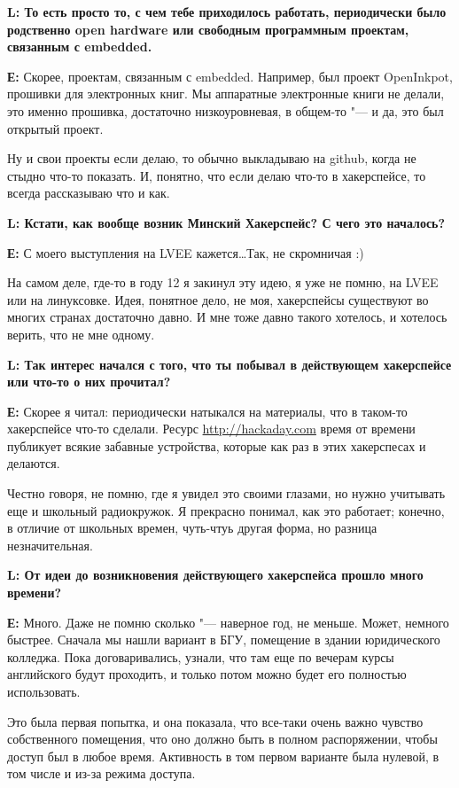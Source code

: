 \documentclass[10pt, a5paper]{article}
\begin{document}
{\noindent \bf L: То есть просто то, с чем тебе приходилось работать, периодически  было родственно open hardware или свободным программным проектам, связанным с embedded.}

{\noindent \bf Е:}  Скорее, проектам, связанным с embedded. Например, был проект OpenInkpot,  прошивки для электронных книг. Мы аппаратные электронные книги не делали, это именно прошивка, достаточно низкоуровневая, в общем-то "--- и да, это был открытый проект.

Ну и свои проекты если делаю, то обычно выкладываю на github, когда не стыдно что-то показать. И, понятно, что если делаю что-то в хакерспейсе, то всегда рассказываю что и как.

{\noindent \bf L: Кстати, как вообще возник Минский Хакерспейс? С чего это началось?}

{\noindent \bf Е:} С моего выступления на LVEE кажется\ldots Так, не скромничая :)

На самом деле, где-то в году 12 я закинул эту идею, я уже не помню, на LVEE или на линуксовке. Идея, понятное дело, не моя, хакерспейсы существуют во многих странах достаточно давно. И мне тоже давно такого хотелось, и хотелось верить, что не мне одному.



{\noindent \bf L: Так интерес начался с того, что ты побывал в действующем хакерспейсе или что-то о них прочитал?}

{\noindent \bf Е:} Скорее я читал: периодически натыкался на материалы,  что в таком-то хакерспейсе что-то сделали. Ресурс  \url{http://hackaday.com} время от времени публикует всякие забавные устройства, которые как раз в этих хакерспесах и делаются.

Честно говоря, не помню, где я увидел это своими глазами, но нужно учитывать еще и школьный радиокружок. Я прекрасно понимал, как это работает; конечно, в отличие от школьных времен, чуть-чтуь другая форма, но разница незначительная.

{\noindent \bf L: От идеи до возникновения действующего хакерспейса прошло много времени?}

{\noindent \bf Е:} Много. Даже не помню сколько "--- наверное год, не меньше. Может, немного быстрее.  Сначала мы нашли вариант в БГУ, помещение в здании юридического колледжа. Пока договаривались, узнали, что там еще по вечерам курсы английского будут проходить, и только потом можно будет его полностью использовать.

Это была первая попытка, и она показала, что все-таки очень важно чувство собственного помещения, что оно должно быть в полном распоряжении, чтобы доступ был в любое время. Активность в том первом варианте была нулевой, в том числе и из-за режима доступа.
\end{document}
